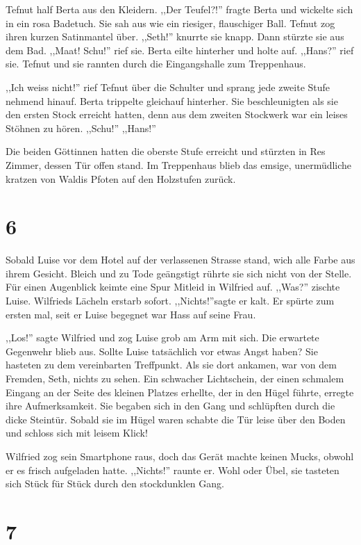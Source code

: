 Tefnut half Berta aus den Kleidern. ,,Der Teufel?!'' fragte Berta und wickelte sich in ein rosa Badetuch. Sie sah aus wie ein riesiger, flauschiger Ball. Tefnut zog ihren kurzen Satinmantel über. ,,Seth!'' knurrte sie knapp. Dann stürzte sie aus dem Bad. ,,Maat! Schu!'' rief sie. Berta eilte hinterher und holte auf. ,,Hans?'' rief sie. Tefnut und sie rannten durch die Eingangshalle zum Treppenhaus.

,,Ich weiss nicht!'' rief Tefnut über die Schulter und sprang jede zweite Stufe nehmend hinauf. Berta trippelte gleichauf hinterher. Sie beschleunigten als sie den ersten Stock erreicht hatten, denn aus dem zweiten Stockwerk war ein leises Stöhnen zu hören. ,,Schu!'' ,,Hans!''

Die beiden Göttinnen hatten die oberste Stufe erreicht und stürzten in Res Zimmer, dessen Tür offen stand. Im Treppenhaus blieb das emsige, unermüdliche kratzen von Waldis Pfoten auf den Holzstufen zurück.

\section*{6}

Sobald Luise vor dem Hotel auf der verlassenen Strasse stand, wich alle Farbe aus ihrem Gesicht. Bleich und zu Tode geängstigt rührte sie sich nicht von der Stelle. Für einen Augenblick keimte eine Spur Mitleid in Wilfried auf. ,,Was?'' zischte Luise. Wilfrieds Lächeln erstarb sofort. ,,Nichts!''sagte er kalt. Er spürte zum ersten mal, seit er Luise begegnet war Hass auf seine  Frau.

,,Los!'' sagte Wilfried und zog Luise grob am Arm mit sich. Die erwartete Gegenwehr blieb aus. Sollte Luise tatsächlich vor etwas Angst haben? Sie hasteten zu dem vereinbarten Treffpunkt. Als sie dort ankamen, war von dem Fremden, Seth, nichts zu sehen. Ein schwacher Lichtschein, der einen schmalem Eingang an der Seite des kleinen Platzes erhellte, der in den Hügel führte, erregte ihre Aufmerksamkeit. Sie begaben sich in den Gang und schlüpften durch die dicke Steintür. Sobald sie im Hügel waren schabte die Tür leise über den Boden und schloss sich mit leisem Klick!

Wilfried zog sein Smartphone raus, doch das Gerät machte keinen Mucks, obwohl er es frisch aufgeladen hatte. ,,Nichts!'' raunte er. Wohl oder Übel, sie tasteten sich Stück für Stück durch den stockdunklen Gang.

\section*{7}

